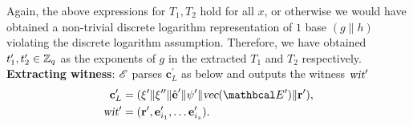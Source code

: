 Again, the above expressions for $T_1, T_2$ hold for all $x$, or otherwise we would have obtained a non-trivial discrete logarithm representation of $1$ base $(g\|h)$ violating the discrete logarithm assumption.
Therefore, we have obtained $t_1^{\prime}, t_2^{\prime} \in \mathbb{Z}_q$ as the exponents of $g$ in the extracted $T_1$ and $T_2$ respectively.\\

\noindent
\textbf{Extracting witness}: $\mathscr{E}$ parses $\textbf{c}_L^{\prime}$ as below and outputs the witness $\textsl{wit}^{\prime}$ 
\begin{align*}
    \textbf{c}_L^{\prime} &= (\xi^{\prime} \| \xi^{\prime \prime} \| \hat{\textbf{e}}^{\prime} \| \psi^{\prime}\| \textsl{vec}(\Emat^{\prime}) \| \textbf{r}^{\prime}), \\
    \textsl{wit}^{\prime} &= (\textbf{r}^{\prime}, \textbf{e}_{i_1}^{\prime}, \dots \textbf{e}_{i_s}^{\prime}).
\end{align*}

